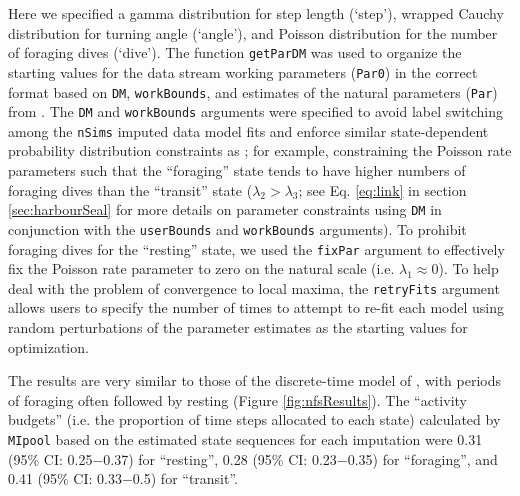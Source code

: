 \documentclass[12pt]{article}\usepackage[]{graphicx}\usepackage[]{xcolor}
\begin{document}
Here we specified a gamma distribution for step length (`step'), wrapped Cauchy distribution for turning angle (`angle'), and Poisson distribution for the number of foraging dives (`dive'). The function \verb|getParDM| was used to organize the starting values for the data stream working parameters (\verb|Par0|) in the correct format based on \verb|DM|, \verb|workBounds|, and estimates of the natural parameters (\verb|Par|) from \cite{McClintockEtAl2014b}. The \verb|DM| and \verb|workBounds| arguments were specified to avoid label switching among the \verb|nSims| imputed data model fits and enforce similar state-dependent probability distribution constraints as \cite{McClintockEtAl2014b}; for example, constraining the Poisson rate parameters such that the ``foraging'' state tends to have higher numbers of foraging dives than the ``transit'' state ($\lambda_2 > \lambda_3$; see Eq. \ref{eq:link} in section \ref{sec:harbourSeal} for more details on parameter constraints using \verb|DM| in conjunction with the \verb|userBounds| and \verb|workBounds| arguments). To prohibit foraging dives for the ``resting'' state, we used the \verb|fixPar| argument to effectively fix the Poisson rate parameter to zero on the natural scale (i.e. $\lambda_1 \approx 0$).  To help deal with the problem of convergence to local maxima, the \verb|retryFits| argument allows users to specify the number of times to attempt to re-fit each model using random perturbations of the parameter estimates as the starting values for optimization.

The results are very similar to those of the discrete-time model of \cite{McClintockEtAl2014b}, with periods of foraging often followed by resting (Figure \ref{fig:nfsResults}).  The ``activity budgets'' (i.e. the proportion of time steps allocated to each state) calculated by \verb|MIpool| based on the estimated state sequences for each imputation were 0.31 (95\% CI: 0.25$-$0.37) for ``resting'', 0.28 (95\% CI: 0.23$-$0.35) for ``foraging'', and 0.41 (95\% CI: 0.33$-$0.5) for ``transit''.
\end{document}
